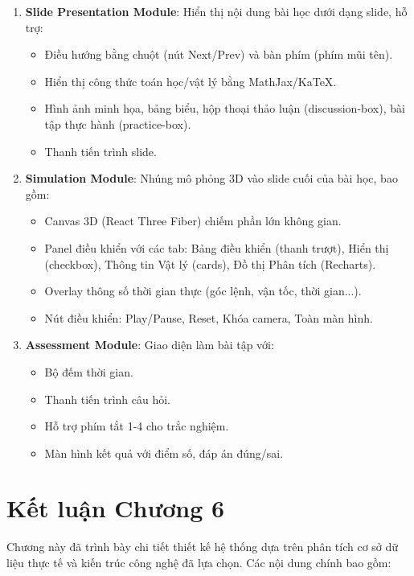 \begin{enumerate}
    \item \textbf{Slide Presentation Module}: Hiển thị nội dung bài học dưới dạng slide, hỗ trợ:
    \begin{itemize}
        \item Điều hướng bằng chuột (nút Next/Prev) và bàn phím (phím mũi tên).
        \item Hiển thị công thức toán học/vật lý bằng MathJax/KaTeX.
        \item Hình ảnh minh họa, bảng biểu, hộp thoại thảo luận (discussion-box), bài tập thực hành (practice-box).
        \item Thanh tiến trình slide.
    \end{itemize}
    
    \item \textbf{Simulation Module}: Nhúng mô phỏng 3D vào slide cuối của bài học, bao gồm:
    \begin{itemize}
        \item Canvas 3D (React Three Fiber) chiếm phần lớn không gian.
        \item Panel điều khiển với các tab: Bảng điều khiển (thanh trượt), Hiển thị (checkbox), Thông tin Vật lý (cards), Đồ thị Phân tích (Recharts).
        \item Overlay thông số thời gian thực (góc lệnh, vận tốc, thời gian...).
        \item Nút điều khiển: Play/Pause, Reset, Khóa camera, Toàn màn hình.
    \end{itemize}
    
    \item \textbf{Assessment Module}: Giao diện làm bài tập với:
    \begin{itemize}
        \item Bộ đếm thời gian.
        \item Thanh tiến trình câu hỏi.
        \item Hỗ trợ phím tắt 1-4 cho trắc nghiệm.
        \item Màn hình kết quả với điểm số, đáp án đúng/sai.
    \end{itemize}
    
\end{enumerate}

\section{Kết luận Chương 6}

Chương này đã trình bày chi tiết thiết kế hệ thống dựa trên phân tích cơ sở dữ liệu thực tế và kiến trúc công nghệ đã lựa chọn. Các nội dung chính bao gồm:


